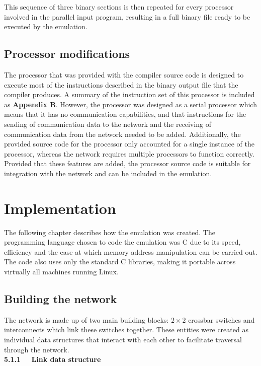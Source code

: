 \documentclass[a4paper, 12pt]{article}
\begin{document}
This sequence of three binary sections is then repeated for every processor involved in the parallel input program, resulting in a full binary file ready to be executed by the emulation.

\subsection{Processor modifications}
\label{sec:processor_mods}

The processor that was provided with the compiler source code is designed to execute most of the instructions described in the binary output file that the compiler produces. A summary of the instruction set of this processor is included as \textbf{Appendix B}. However, the processor was designed as a serial processor which means that it has no communication capabilities, and that instructions for the sending of communication data to the network and the receiving of communication data from the network needed to be added. Additionally, the provided source code for the processor only accounted for a single instance of the processor, whereas the network requires multiple processors to function correctly. Provided that these features are added, the processor source code is suitable for integration with the network and can be included in the emulation. 

\newpage
\section{Implementation}

The following chapter describes how the emulation was created. The programming language chosen to code the emulation was C due to its speed, efficiency and the ease at which memory address manipulation can be carried out. The code also uses only the standard C libraries, making it portable across virtually all machines running Linux.

\subsection{Building the network}

The network is made up of two main building blocks: $2 \times 2$ crossbar switches and interconnects which link these switches together. These entities were created as individual data structures that interact with each other to facilitate traversal through the network.\\

\noindent\textbf{5.1.1 \ \ Link data structure}
\end{document}
